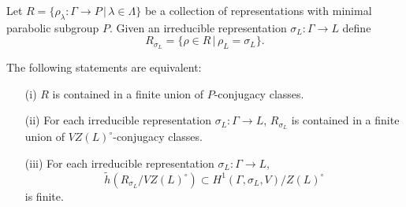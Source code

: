 \begin{lemma}
  Let $R = \{\rho_\lambda:\Gamma\rightarrow P\,|\,\lambda\in\Lambda\}$ be a collection of representations with minimal parabolic subgroup $P$. Given an irreducible representation $\sigma_L:\Gamma\rightarrow L$ define
  \begin{displaymath}
    R_{\sigma_L} = \{\rho \in R\,|\,\rho_L = \sigma_L\}. 
  \end{displaymath}
  
  The following statements are equivalent:
  \begin{itemize}
    \item[(i)] $R$ is contained in a finite union of $P$-conjugacy classes.
    \item[(ii)] For each irreducible representation $\sigma_L:\Gamma\rightarrow L$, $R_{\sigma_L}$ is contained in a finite union of $VZ(L)^\circ$-conjugacy classes.
    \item[(iii)] For each irreducible representation $\sigma_L:\Gamma\rightarrow L$,
      \begin{displaymath}
	\tilde{h}(R_{\sigma_L}/VZ(L)^\circ) \subset H^{1}(\Gamma,\sigma_L,V)/Z(L)^\circ
      \end{displaymath}
      is finite.
  \end{itemize}
  \label{lem:p_h1}
\end{lemma}
